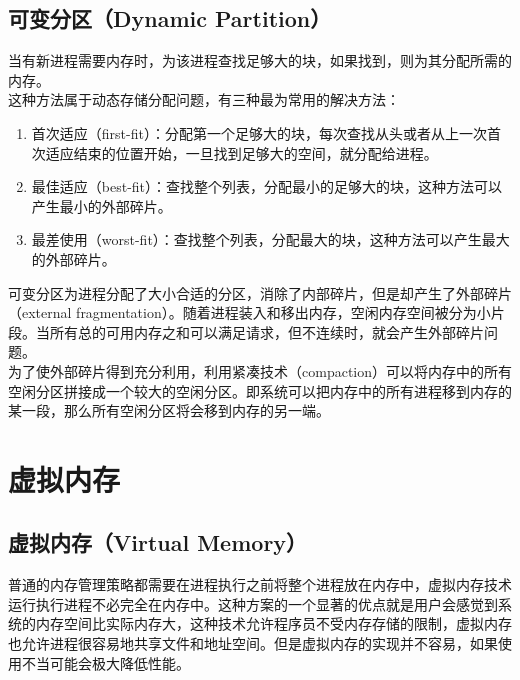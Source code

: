 \subsection{可变分区（Dynamic Partition）}

当有新进程需要内存时，为该进程查找足够大的块，如果找到，则为其分配所需的内存。 \\

这种方法属于动态存储分配问题，有三种最为常用的解决方法：

\begin{enumerate}
    \item 首次适应（first-fit）：分配第一个足够大的块，每次查找从头或者从上一次首次适应结束的位置开始，一旦找到足够大的空间，就分配给进程。
    
    \item 最佳适应（best-fit）：查找整个列表，分配最小的足够大的块，这种方法可以产生最小的外部碎片。
    
    \item 最差使用（worst-fit）：查找整个列表，分配最大的块，这种方法可以产生最大的外部碎片。
\end{enumerate}

可变分区为进程分配了大小合适的分区，消除了内部碎片，但是却产生了外部碎片（external fragmentation）。随着进程装入和移出内存，空闲内存空间被分为小片段。当所有总的可用内存之和可以满足请求，但不连续时，就会产生外部碎片问题。 \\

为了使外部碎片得到充分利用，利用紧凑技术（compaction）可以将内存中的所有空闲分区拼接成一个较大的空闲分区。即系统可以把内存中的所有进程移到内存的某一段，那么所有空闲分区将会移到内存的另一端。

\newpage

\section{虚拟内存}

\subsection{虚拟内存（Virtual Memory）}

普通的内存管理策略都需要在进程执行之前将整个进程放在内存中，虚拟内存技术运行执行进程不必完全在内存中。这种方案的一个显著的优点就是用户会感觉到系统的内存空间比实际内存大，这种技术允许程序员不受内存存储的限制，虚拟内存也允许进程很容易地共享文件和地址空间。但是虚拟内存的实现并不容易，如果使用不当可能会极大降低性能。 \\

